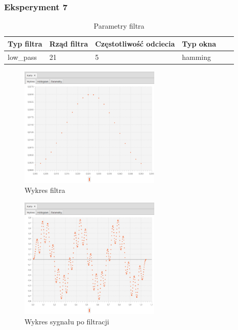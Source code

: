 \documentclass[12pt]{article}
\begin{document}
{{            \subsubsection{Eksperyment 7} {
                \begin{table}[H]
                \centering
                \begin{tabular}{|l|l|l|l|l|l|}
                \hline
                Typ filtra & Rząd filtra & Częstotliwość odciecia & Typ okna  \\\hline
                low\_pass & 21 & 5 & hamming     \\\hline
                \end{tabular}
                \caption{Parametry filtra}
                \end{table}
                \begin{figure}[H]
                \centering
                \includegraphics[width=0.6\textwidth]{img/result/filter/experiment07/data_draw_2c_filter_data_114026.png}
                \caption{Wykres filtra}
                \end{figure}

                \begin{figure}[H]
                \centering
                \includegraphics[width=0.6\textwidth]{img/result/filter/experiment07/data_draw_2c_result_data_114030.png}
                \caption{Wykres sygnału po filtracji}
                \end{figure}
            }
            \newpage

}}
\end{document}
